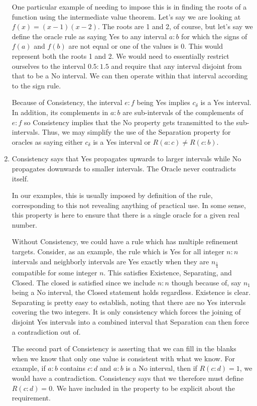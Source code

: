 \documentclass[12pt]{article}
\begin{document}
\begin{enumerate}
    One particular example of needing to impose this is in finding the roots of a function using the intermediate value theorem. Let's say we are looking at $f(x) = (x-1)(x-2)$. The roots are 1 and 2, of course, but let's say we define the oracle rule as saying Yes to any interval $a:b$ for which the signs of $f(a)$ and $f(b)$ are not equal or one of the values is 0. This would represent both the roots 1 and 2. We would need to essentially restrict ourselves to the interval $0.5:1.5$ and require that any interval disjoint from that to be a No interval. We can then operate within that interval according to the sign rule. 

Because of Consistency, the interval $e:f$ being Yes implies $c_{\delta}$ is a Yes interval. In addition, its complements in $a:b$ are sub-intervals of the complements of $e:f$ so Consistency implies that the No property gets transmitted to the sub-intervals. Thus, we may simplify the use of the Separation property for oracles as saying either $c_{\delta}$ is a Yes interval or $R(a:c) \neq R(c:b)$.

    \item Consistency says that Yes propagates upwards to larger intervals while No propagates downwards to smaller intervals. The Oracle never contradicts itself. 
    
    In our examples, this is usually imposed by definition of the rule, corresponding to this not revealing anything of practical use. In some sense, this property is here to ensure that there is a single oracle for a given real number.


    Without Consistency, we could have a rule which has multiple refinement targets. Consider, as an example, the rule which is Yes for all integer $n:n$ intervals and neighborly intervals are Yes exactly when they are $n_{\frac{1}{4}}$ compatible for some integer $n$. This satisfies Existence, Separating, and Closed. The closed is satisfied since we include $n:n$ though because of, say $n_1$ being a No interval, the Closed statement holds regardless. Existence is clear. Separating is pretty easy to establish, noting that there are no Yes intervals covering the two integers. It is only consistency which forces the joining of disjoint Yes intervals into a combined interval that Separation can then force a contradiction out of.  

    The second part of Consistency is asserting that we can fill in the blanks when we know that only one value is consistent with what we know. For example, if $a:b$ contains $c:d$ and $a:b$ is a No interval, then if $R(c:d) = 1$, we would have a contradiction. Consistency says that we therefore must define $R(c:d)=0$. We have included in the property to be explicit about the requirement.
    

\end{enumerate}
\end{document}
